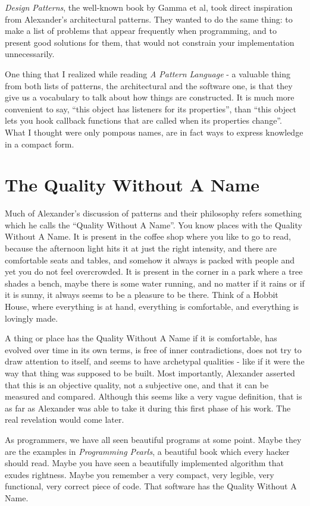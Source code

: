 \textit{Design Patterns}, the well-known book by Gamma et al, took direct inspiration from Alexander's architectural patterns. They wanted to do the same thing: to make a list of problems that appear frequently when programming, and to present good solutions for them, that would not constrain your implementation unnecessarily.

One thing that I realized while reading \textit{A Pattern Language} - a valuable thing from both lists of patterns, the architectural and the software one, is that they give us a vocabulary to talk about how things are constructed. It is much more convenient to say, ``this object has listeners for its properties'', than ``this object lets you hook callback functions that are called when its properties change''. What I thought were only pompous names, are in fact ways to express knowledge in a compact form.

\section*{The Quality Without A Name}

Much of Alexander's discussion of patterns and their philosophy refers something which he calls the ``Quality Without A Name''. You know places with the Quality Without A Name. It is present in the coffee shop where you like to go to read, because the afternoon light hits it at just the right intensity, and there are comfortable seats and tables, and somehow it always is packed with people and yet you do not feel overcrowded. It is present in the corner in a park where a tree shades a bench, maybe there is some water running, and no matter if it rains or if it is sunny, it always seems to be a pleasure to be there. Think of a Hobbit House, where everything is at hand, everything is comfortable, and everything is lovingly made.

A thing or place has the Quality Without A Name if it is comfortable, has evolved over time in its own terms, is free of inner contradictions, does not try to draw attention to itself, and seems to have archetypal qualities - like if it were the way that thing was supposed to be built. Most importantly, Alexander asserted that this is an objective quality, not a subjective one, and that it can be measured and compared. Although this seems like a very vague definition, that is as far as Alexander was able to take it during this first phase of his work. The real revelation would come later.

As programmers, we have all seen beautiful programs at some point. Maybe they are the examples in \textit{Programming Pearls}, a beautiful book which every hacker should read. Maybe you have seen a beautifully implemented algorithm that exudes rightness.  Maybe you remember a very compact, very legible, very functional, very correct piece of code. That software has the Quality Without A Name.

